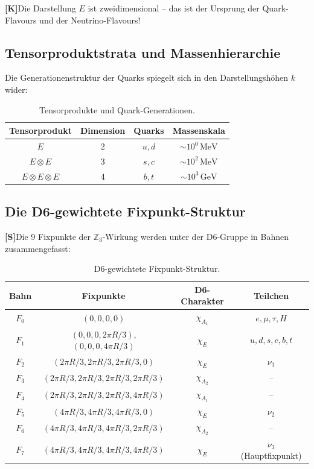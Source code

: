 \documentclass[11pt,a4paper]{article}
\newcommand{\Kstatus}{\textbf{[K]}}
\newcommand{\Sstatus}{\textbf{[S]}}
\begin{document}
	\Kstatus Die Darstellung $E$ ist zweidimensional -- das ist der Ursprung der Quark-Flavours und der Neutrino-Flavours!
	
	\subsection{Tensorproduktstrata und Massenhierarchie}
	
	Die Generationenstruktur der Quarks spiegelt sich in den Darstellungshöhen $k$ wider:
	
	\begin{table}[h!]
		\centering
		\caption{Tensorprodukte und Quark-Generationen.}
		\label{tab:tensor_products}
		\begin{tabular}{c c c c}
			\toprule
			\textbf{Tensorprodukt} & \textbf{Dimension} & \textbf{Quarks} & \textbf{Massenskala} \\
			\midrule
			$E$ & 2 & $u, d$ & $\sim 10^0\,\text{MeV}$ \\
			$E \otimes E$ & 3 & $s, c$ & $\sim 10^2\,\text{MeV}$ \\
			$E \otimes E \otimes E$ & 4 & $b, t$ & $\sim 10^3\,\text{GeV}$ \\
			\bottomrule
		\end{tabular}
	\end{table}
	
	\subsection{Die D6-gewichtete Fixpunkt-Struktur}
	
	\Sstatus Die 9 Fixpunkte der $\mathbb{Z}_3$-Wirkung werden unter der D6-Gruppe in Bahnen zusammengefasst:
	
	\begin{table}[h!]
		\centering
		\caption{D6-gewichtete Fixpunkt-Struktur.}
		\label{tab:d6_fix}
		\begin{tabular}{c c c c}
			\toprule
			\textbf{Bahn} & \textbf{Fixpunkte} & \textbf{D6-Charakter} & \textbf{Teilchen} \\
			\midrule
			$F_0$ & $(0,0,0,0)$ & $\chi_{A_1}$ & $e, \mu, \tau, H$ \\
			$F_1$ & $(0,0,0,2\pi R/3)$, $(0,0,0,4\pi R/3)$ & $\chi_E$ & $u, d, s, c, b, t$ \\
			$F_2$ & $(2\pi R/3,2\pi R/3,2\pi R/3,0)$ & $\chi_E$ & $\nu_1$ \\
			$F_3$ & $(2\pi R/3,2\pi R/3,2\pi R/3,2\pi R/3)$ & $\chi_{A_2}$ & -- \\
			$F_4$ & $(2\pi R/3,2\pi R/3,2\pi R/3,4\pi R/3)$ & $\chi_{A_1}$ & -- \\
			$F_5$ & $(4\pi R/3,4\pi R/3,4\pi R/3,0)$ & $\chi_E$ & $\nu_2$ \\
			$F_6$ & $(4\pi R/3,4\pi R/3,4\pi R/3,2\pi R/3)$ & $\chi_{A_2}$ & -- \\
			$F_7$ & $(4\pi R/3,4\pi R/3,4\pi R/3,4\pi R/3)$ & $\chi_E$ & $\nu_3$ (Hauptfixpunkt) \\
			\bottomrule
		\end{tabular}
	\end{table}
	
\end{document}

